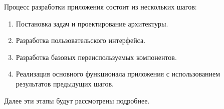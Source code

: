 %
%

Процесс разработки приложения состоит из нескольких шагов:
\begin{enumerate}[1)]
	\item Постановка задач и проектирование архитектуры.
	
	\item Разработка пользовательского интерфейса.
	
	\item Разработка базовых переиспользуемых компонентов.
	
	\item Реализация основного функционала приложения с использованием результатов предыдущих шагов.
\end{enumerate}

Далее эти этапы будут рассмотрены подробнее.
